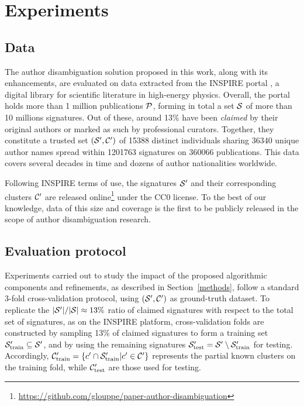 \documentclass{article}
\begin{document}

\section{Experiments}
\label{experiments}

\subsection{Data}

The author disambiguation solution proposed in this work, along with its
enhancements, are evaluated on data extracted from the INSPIRE portal
\citep{gentil2009information}, a digital library for scientific literature in
high-energy physics. Overall, the portal holds more than 1 million
publications ${\cal P}$, forming in total a set ${\cal S}$ of more than 10 millions
signatures. Out of these, around 13\% have been \textit{claimed} by their
original authors or marked as such by professional curators. Together, they
constitute a trusted set $({\cal S}^\prime, {\cal C}^\prime)$ of 15388 distinct individuals sharing
36340 unique author names spread within 1201763 signatures on 360066
publications. This data covers several decades in time and dozens of author
nationalities worldwide.

Following INSPIRE terms of use, the signatures ${\cal S}^\prime$ and their
corresponding clusters ${\cal C}^\prime$ are released
online\footnote{\url{https://github.com/glouppe/paper-author-disambiguation}}
under the CC0 license. To the best of our knowledge, data of this size and
coverage is the first to be publicly released in the scope of author
disambiguation research.

\subsection{Evaluation protocol}

Experiments carried out to study the impact of the proposed algorithmic
components and refinements, as described in Section~\ref{methods}, follow a
standard 3-fold cross-validation protocol, using $({\cal S}^\prime, {\cal
C}^\prime)$ as ground-truth dataset. To replicate the $|{\cal S}^\prime| /
|{\cal S}| \approx 13\%$ ratio of claimed signatures with respect to the total
set of signatures, as on the INSPIRE platform, cross-validation folds are
constructed by sampling 13\% of claimed signatures to form a training set ${\cal
S}_\text{train}^\prime \subseteq {\cal S}^\prime$, and by using the remaining
signatures ${\cal S}_\text{test}^\prime = {\cal S}^\prime \setminus {\cal
S}_\text{train}^\prime$ for testing. Accordingly, ${\cal C}_\text{train}^\prime
= \{ c^\prime \cap {\cal S}_\text{train}^\prime | c^\prime \in {\cal C}^\prime
\}$ represents the partial known clusters on the training fold, while ${\cal
C}_\text{test}^\prime$ are those used for testing.
\end{document}
